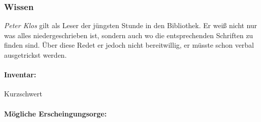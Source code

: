     \subsubsection{Wissen}
        \emph{Peter Klos} gilt als Leser der jüngsten Stunde in den Bibliothek. Er weiß nicht nur was alles niedergeschrieben ist, sondern auch wo die entsprechenden Schriften zu finden sind. Über diese Redet er jedoch nicht bereitwillig, er müsste schon verbal ausgetrickst werden.

    \paragraph{Inventar:} Kurzschwert

    \paragraph{Mögliche Erscheingungsorge:} 
